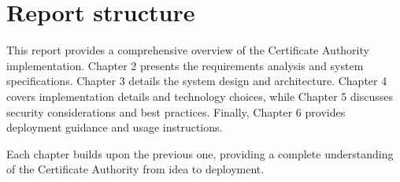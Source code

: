 \section{Report structure}

This report provides a comprehensive overview of the Certificate Authority implementation. 
Chapter 2 presents the requirements analysis and system specifications. 
Chapter 3 details the system design and architecture. 
Chapter 4 covers implementation details and technology choices, while Chapter 5 discusses security 
considerations and best practices. 
Finally, Chapter 6 provides deployment guidance and usage instructions.

Each chapter builds upon the previous one, providing a complete understanding of the Certificate 
Authority from idea to deployment.

